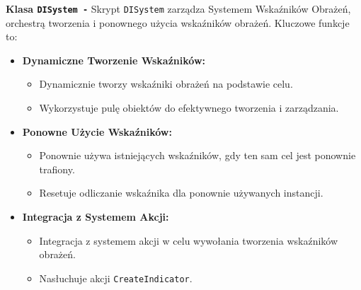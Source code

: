 \textbf{Klasa \texttt{DISystem -}}
Skrypt \texttt{DISystem} zarządza Systemem Wskaźników Obrażeń, orchestrą tworzenia i ponownego użycia wskaźników obrażeń. Kluczowe funkcje to:
\begin{itemize}
\item \textbf{Dynamiczne Tworzenie Wskaźników:}
\begin{itemize}
\item Dynamicznie tworzy wskaźniki obrażeń na podstawie celu.
\item Wykorzystuje pulę obiektów do efektywnego tworzenia i zarządzania.
\end{itemize}
\item \textbf{Ponowne Użycie Wskaźników:}
\begin{itemize}
\item Ponownie używa istniejących wskaźników, gdy ten sam cel jest ponownie trafiony.
\item Resetuje odliczanie wskaźnika dla ponownie używanych instancji.
\end{itemize}
\item \textbf{Integracja z Systemem Akcji:}
\begin{itemize}
\item Integracja z systemem akcji w celu wywołania tworzenia wskaźników obrażeń.
\item Nasłuchuje akcji \texttt{CreateIndicator}.
\end{itemize}
\end{itemize}

